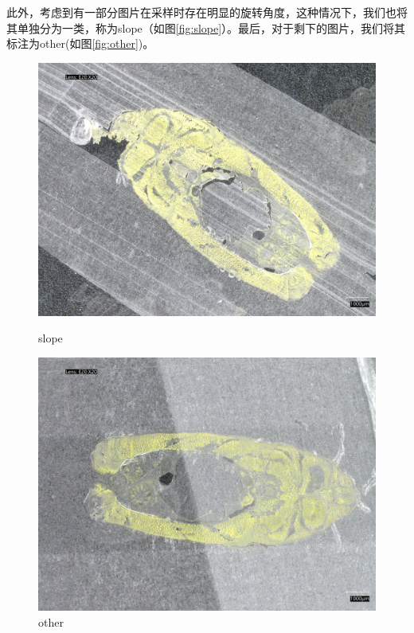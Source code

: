 此外，考虑到有一部分图片在采样时存在明显的旋转角度，这种情况下，我们也将其单独分为一类，称为slope（如图\autoref{fig:slope}）。最后，对于剩下的图片，我们将其标注为other(如图\autoref{fig:other})。

\begin{figure}[H]
    \centering
    \begin{minipage}{0.45\textwidth}
        \centering
        \includegraphics[width=\textwidth]{./fig/sample_1/slope.jpg}
        \caption{slope}
        \label{fig:slope}
    \end{minipage}
    \begin{minipage}{0.45\textwidth}
        \centering
        \includegraphics[width=\textwidth]{./fig/sample_1/other.jpg}
        \caption{other}
        \label{fig:other}
    \end{minipage}
\end{figure}

